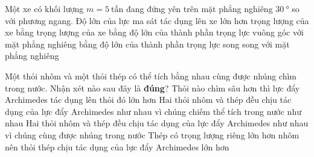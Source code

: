 \begin{ex}
	Một xe có khối lượng $m=\SI{5}{\text{tấn}}$ đang đứng yên trên mặt phẳng nghiêng $\SI{30}{\degree}$ so với phương ngang. Độ lớn của lực ma sát tác dụng lên xe
	\choice
	{lớn hơn trọng lượng của xe}
	{bằng trọng lượng của xe}
	{bằng độ lớn của thành phần trọng lực vuông góc với mặt phẳng nghiêng}
	{\True bằng độ lớn của thành phần trọng lực song song với mặt phẳng nghiêng}
	\loigiai{}
\end{ex}
\begin{ex}
Một thỏi nhôm và một thỏi thép có thể tích bằng nhau cùng được nhúng chìm trong nước. Nhận xét nào sau đây là \textbf{đúng}?	
	\choice
	{Thỏi nào chìm sâu hơn thì lực đẩy Archimedes tác dụng lên thỏi đó lớn hơn}
	{\True Hai thỏi nhôm và thép đều chịu tác dụng của lực đẩy Archimedes như nhau vì chúng chiếm thể tích trong nước như nhau}
	{Hai thỏi nhôm và thép đều chịu tác dụng của lực đẩy Archimedes như nhau vì chúng cùng được nhúng trong nước}
	{Thép có trọng lượng riêng lớn hơn nhôm nên thỏi thép chịu tác dụng của lực đẩy Archimedes lớn hơn}
	\loigiai{}
\end{ex}

